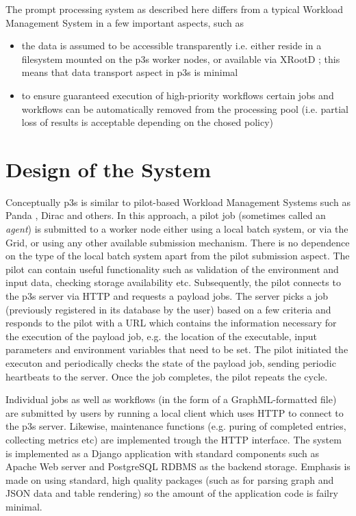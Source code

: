 \documentclass{PoS}
\begin{document}
\noindent The prompt processing system as described here differs from a typical Workload Management System in a few important
aspects, such as
\begin{itemize}
\item the data is assumed to be accessible transparently i.e. either reside in a filesystem mounted on the p3s worker nodes,
or available via XRootD \cite{xrootd}; this means that data transport aspect in p3s is minimal

\item to ensure guaranteed execution of high-priority workflows certain jobs and workflows can be automatically
removed from the processing pool (i.e. partial loss of results is acceptable depending on the chosed policy)

\end{itemize}

\section{Design of the System}
Conceptually p3s is similar to pilot-based Workload Management Systems such as Panda \cite{panda}, Dirac \cite{dirac} and others. In this approach,
a pilot job (sometimes called an \textit{agent}) is submitted to a worker node either using a local batch system, or via the Grid, or using
any other available submission mechanism. There is no dependence on the type of the local batch system apart from the pilot
submission aspect. The pilot can contain useful functionality such as validation of the environment and input data, checking
storage availability etc. Subsequently, the pilot connects to the p3s server via HTTP and requests a payload jobs. The server
picks a job (previously registered in its database by the user) based on a few criteria and responds to the pilot with a URL
which contains the information necessary for the execution of the payload job, e.g. the location of the executable, input parameters
and environment variables that need to be set. The pilot initiated the executon and periodically checks the state of the payload
job, sending periodic heartbeats to the server. Once the job completes, the pilot repeats the cycle.

Individual jobs as well as workflows (in the form of a GraphML-formatted file) are submitted by users
by running a local client which uses HTTP to connect to the p3s server. Likewise, maintenance functions
(e.g. puring of completed entries, collecting metrics etc) are implemented trough the HTTP interface.
The system is implemented as a Django \cite{django} application with standard components such as Apache Web server
and PostgreSQL RDBMS as the backend storage. Emphasis is made on using standard, high quality packages
(such as for parsing graph and JSON data and table rendering) so the amount of the application code is
failry minimal.
\end{document}
